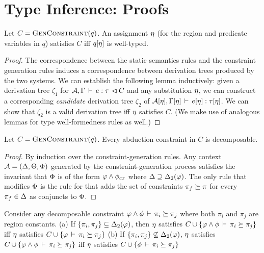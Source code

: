 \section{Type Inference: Proofs}

\begin{theorem}
\label{thm:constraint-generation-sc}
Let $C = \textsc{GenConstraint}(q)$.
An assignment $\eta$ (for the region and predicate variables in $q$)
satisfies $C$ iff $q[\eta]$ is well-typed.
\end{theorem}
\begin{proof}
The correspondence between the static semantics rules and the constraint generation
rules induces a correspondence between derivation trees produced by the
two systems.
We can establish the following lemma inductively:
given a derivation tree $\zeta_1$ for
${{\mathcal{A}},\Gamma} \, \vdash \, {e} : {\tau} \, \lhd {C}$
and any substitution $\eta$,
we can construct a corresponding \emph{candidate} derivation
tree $\zeta_2$ of ${\mathcal{A}}[\eta],\Gamma[\eta]\,\vdash\,e[\eta]:\tau[\eta]$.
We can show that $\zeta_2$ is a valid derivation tree iff $\eta$ satisfies $C$.
(We make use of analogous lemmas for type well-formedness rules as well.)
\end{proof}

\begin{lemma}
  \label{lemma:gc-is-decomposable}
  Let $C = \textsc{GenConstraint}(q)$. Every abduction constraint in $C$ is decomposable.
\end{lemma}

\begin{proof}
  By induction over the constraint-generation rules.
  Any context ${\mathcal{A}} = (\Delta,\Theta,\Phi)$ generated by the constraint-generation
  process satisfies the invariant that $\Phi$ is of the form $\varphi \wedge \phi_{cx}$
  where $\Delta \supseteq {\Delta_2}(\varphi)$.
  The only rule that modifies $\Phi$ is the rule for 
  that adds the set of constraints $\pi_f \succeq \pi$ for every $\pi_f \in \Delta$
  as conjuncts to $\Phi$.
\end{proof}

\begin{lemma}
  \label{lemma:decomposition}
  Consider any decomposable constraint  $\varphi \wedge \phi\,\vdash\,\pi_i \succeq \pi_j$
where both $\pi_i$ and $\pi_j$ are region constants.
(a) If $\{ \pi_i, \pi_j \} \subseteq {\Delta_2}(\varphi)$,
then $\eta$ satisfies $C \cup \{ \varphi \wedge \phi\,\vdash\,\pi_i \succeq \pi_j \}$
iff
$\eta$ satisfies $C \cup \{ \varphi\,\vdash\,\pi_i \succeq \pi_j \}$
  (b) If $\{ \pi_i, \pi_j \} \not \subseteq {\Delta_2}(\varphi)$,
$\eta$ satisfies $C \cup \{ \varphi \wedge \phi\,\vdash\,\pi_i \succeq \pi_j \}$
iff
$\eta$ satisfies $C \cup \{ \phi\,\vdash\,\pi_i \succeq \pi_j \}$
\end{lemma}

